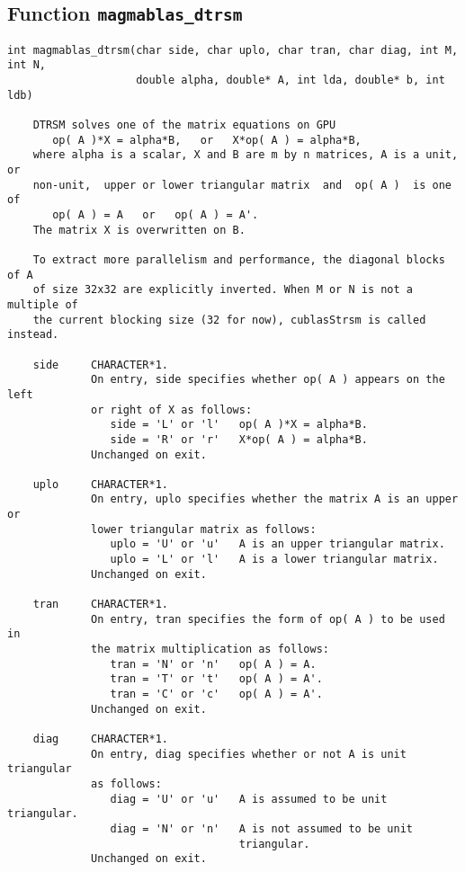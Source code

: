 \documentclass[10pt]{book}
\begin{document}
\subsection{Function {\tt {\bf magmablas\_dtrsm}}}
\begin{verbatim}
int magmablas_dtrsm(char side, char uplo, char tran, char diag, int M, int N, 
                    double alpha, double* A, int lda, double* b, int ldb)

    DTRSM solves one of the matrix equations on GPU  
       op( A )*X = alpha*B,   or   X*op( A ) = alpha*B,
    where alpha is a scalar, X and B are m by n matrices, A is a unit, or
    non-unit,  upper or lower triangular matrix  and  op( A )  is one  of 
       op( A ) = A   or   op( A ) = A'.  
    The matrix X is overwritten on B.

    To extract more parallelism and performance, the diagonal blocks of A 
    of size 32x32 are explicitly inverted. When M or N is not a multiple of 
    the current blocking size (32 for now), cublasStrsm is called instead. 

    side     CHARACTER*1.
             On entry, side specifies whether op( A ) appears on the left
             or right of X as follows:
                side = 'L' or 'l'   op( A )*X = alpha*B.  
                side = 'R' or 'r'   X*op( A ) = alpha*B.  
             Unchanged on exit.
   
    uplo     CHARACTER*1.
             On entry, uplo specifies whether the matrix A is an upper or
             lower triangular matrix as follows:
                uplo = 'U' or 'u'   A is an upper triangular matrix.  
                uplo = 'L' or 'l'   A is a lower triangular matrix.  
             Unchanged on exit.
   
    tran     CHARACTER*1.
             On entry, tran specifies the form of op( A ) to be used in
             the matrix multiplication as follows:
                tran = 'N' or 'n'   op( A ) = A.
                tran = 'T' or 't'   op( A ) = A'.
                tran = 'C' or 'c'   op( A ) = A'.
             Unchanged on exit.
  
    diag     CHARACTER*1.
             On entry, diag specifies whether or not A is unit triangular
             as follows:
                diag = 'U' or 'u'   A is assumed to be unit triangular.  
                diag = 'N' or 'n'   A is not assumed to be unit
                                    triangular.  
             Unchanged on exit.
	   

\end{verbatim}
\end{document}
